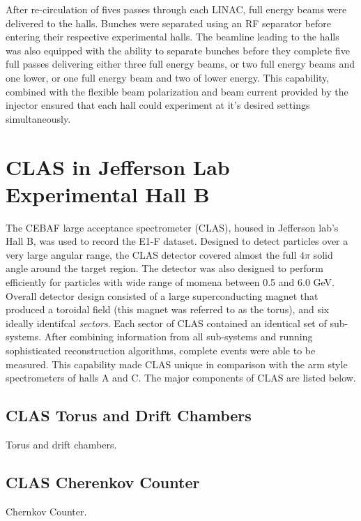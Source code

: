 After re-circulation of fives passes through each LINAC, full energy beams were delivered to the halls.  Bunches were separated using an RF separator before entering their respective experimental halls.  The beamline leading to the halls was also equipped with the ability to separate bunches before they complete five full passes delivering either three full energy beams, or two full energy beams and one lower, or one full energy beam and two of lower energy.  This capability, combined with the flexible beam polarization and beam current provided by the injector ensured that each hall could experiment at it's desired settings simultaneously.  

\section{CLAS in Jefferson Lab Experimental Hall B}
The CEBAF large acceptance spectrometer (CLAS), housed in Jefferson lab's Hall B, was used to record the E1-F dataset.  Designed to detect particles over a very large angular range, the CLAS detector covered almost the full $4\pi$ solid angle around the target region.  The detector was also designed to perform efficiently for particles with wide range of momena between 0.5 and 6.0 GeV.  Overall detector design consisted of a large superconducting magnet that produced a toroidal field (this magnet was referred to as the torus), and six ideally identifcal \textit{sectors}.  Each sector of CLAS contained an identical set of sub-systems.  After combining information from all sub-systems and running sophisticated reconstruction algorithms, complete events were able to be measured.  This capability made CLAS unique in comparison with the arm style spectrometers of halls A and C.  The major components of CLAS are listed below.

\subsection{CLAS Torus and Drift Chambers}
Torus and drift chambers. 

\subsection{CLAS Cherenkov Counter}
Chernkov Counter.

